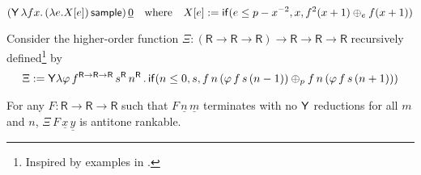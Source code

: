 \begin{example}
\label{ex:non-affine continuous}
\iffalse
\begin{align*}
& (\tY\, \lambda f x.\, (\lambda e. X[e]) \, \tsample)\, \underline 0 \quad \hbox{where}\\
& X[e] := \tif{e \leq p - x^{-2}}{x}{f^2(x+1) \oplus_e f(x+1)}
\end{align*}
\fi
\[
(\mathsf{Y}\, \lambda f x.\, (\lambda e. X[e]) \, \mathsf{sample})\, \underline 0 \quad \hbox{where} \quad
X[e] := \mathsf{if}(e \leq p - x^{-2}, x, f^2(x+1) \oplus_e f(x+1))
\]
\end{example}

\begin{example} \label{ex:higher-order recursion}
Consider the higher-order function
$\Xi : (\textsf{R} \to \textsf{R} \to \textsf{R}) \to \textsf{R} \to \textsf{R} \to \textsf{R}$
recursively defined\footnote{Inspired by examples in \cite{DBLP:journals/pacmpl/BurnOR18,DBLP:conf/lics/OngW19}.} by
\[
\Xi := \mathsf{Y} \lambda \varphi \, f^{\textsf{R} \to \textsf{R} \to \textsf{R}} \, s^\textsf{R} \, n^\textsf{R} \,.\, \mathsf{if}(n \leq 0, s, 
f \, n \, (\varphi \, f \, s \, (n - 1))
\oplus_p
f \, n \, (\varphi \, f \, s \, (n + 1))
)
\]
\iffalse
\[
\begin{array}{l}
\Xi := \tY \lambda \varphi \, f^{\textsf{R} \to \textsf{R} \to \textsf{R}} \, s^\textsf{R} \, n^\textsf{R} . \\
\qquad\tif{n \leq 0}{s}{
f \, n \, (\varphi \, f \, s \, (n - 1))
\oplus_p
f \, n \, (\varphi \, f \, s \, (n + 1))
}
\end{array}
\]
\fi
For any $F : \textsf{R} \to \textsf{R} \to \textsf{R}$ such that $F\, \underline n\, \underline m$ terminates with no $\mathsf{Y}$ reductions for all $m$ and $n$, $\Xi\, F\, \underline x\, \underline y$ is antitone rankable.
\end{example}
\fi

